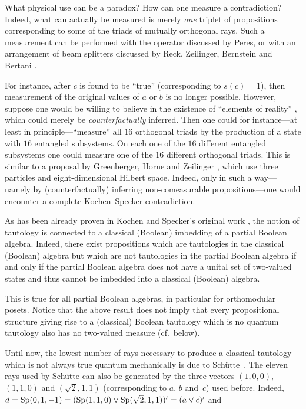 What physical use can be a paradox? How can one measure a contradiction?
Indeed, what can actually be measured is merely {\em one\/} triplet of
propositions corresponding to some of the triads of mutually orthogonal
rays. Such a measurement can be performed with the operator discussed by
Peres, or with an arrangement of beam splitters discussed by Reck,
Zeilinger, Bernstein and Bertani \cite{rzbb}.

For instance, after $c$ is found to be ``true'' (corresponding to $s(c)=1$),
then measurement of the original values of $a$ or $b$ is no longer possible.
However, suppose one would be willing to believe in the existence of
``elements of reality'' \cite{epr,peres-no-results}, which could merely be
{\em counterfactually\/} inferred. Then one could for instance---at least in
principle---``measure'' all $16$ orthogonal triads by the production of a
state with $16$ entangled subsystems. On each one of the $16$ different
entangled subsystems one could measure one of the $16$ different orthogonal
triads. This is similar to a proposal by Greenberger, Horne and Zeilinger
\cite{ghz}, which use three particles and eight-dimensional Hilbert space.
Indeed, only in such a way---namely by (counterfactually) inferring
non-comeasurable propositions---one would encounter a complete
Kochen--Specker contradiction.

As has been already proven in Kochen and Specker's original work \cite[pp.\
82--85, Theorem 4]{Kochen-Specker}, the notion of tautology is connected to a
classical (Boolean) imbedding of a partial Boolean algebra. Indeed, there
exist propositions which are tautologies in the classical (Boolean) algebra
but which are not tautologies in the partial Boolean algebra if and only if
the partial Boolean algebra does not have a unital set of two-valued states
and thus cannot be imbedded into a classical (Boolean) algebra.

This is true for all partial Boolean algebras, in particular for orthomodular
posets. Notice that the above result does not imply that every propositional
structure giving rise to a (classical) Boolean tautology which is no quantum
tautology also has no two-valued measure (cf.\ below).

Until now, the lowest number of rays necessary to produce a classical
tautology which is not always true quantum mechanically is due to
Sch\"utte~\cite {Schuette,svozil-nat-acad}. The eleven rays used by
Sch\"utte can also be generated by the three vectors $(1,0,0)$, $(1,1,0)$
and $(\sqrt{2},1,1)$ (corresponding to $a$, $b$ and~$c$) used before.
Indeed, $d = {\rm Sp} (0,1,-1) = ({\rm Sp} (1,1,0) \lor {\rm Sp} (\sqrt2,1,1))' = (a \lor
c)'$ and

